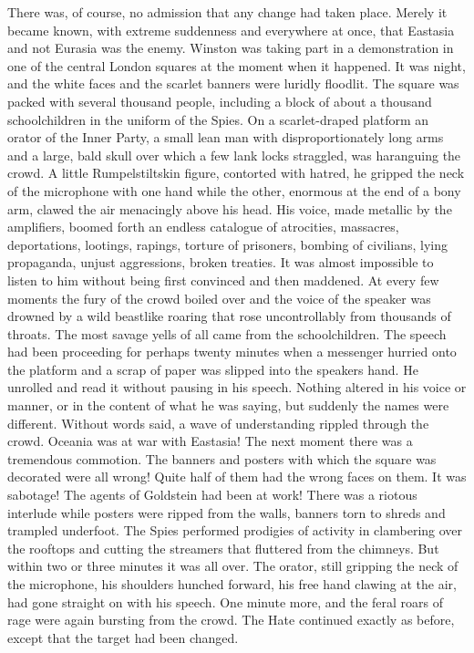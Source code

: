 There was, of course, no admission that any change had taken place.
Merely it became known, with extreme suddenness and everywhere at once,
that Eastasia and not Eurasia was the enemy. Winston was taking part in
a demonstration in one of the central London squares at the moment when
it happened. It was night, and the white faces and the scarlet banners
were luridly floodlit. The square was packed with several thousand
people, including a block of about a thousand schoolchildren in the
uniform of the Spies. On a scarlet-draped platform an orator of the
Inner Party, a small lean man with disproportionately long arms and a
large, bald skull over which a few lank locks straggled, was haranguing
the crowd. A little Rumpelstiltskin figure, contorted with hatred, he
gripped the neck of the microphone with one hand while the other,
enormous at the end of a bony arm, clawed the air menacingly above his
head. His voice, made metallic by the amplifiers, boomed forth an
endless catalogue of atrocities, massacres, deportations, lootings,
rapings, torture of prisoners, bombing of civilians, lying propaganda,
unjust aggressions, broken treaties. It was almost impossible to listen
to him without being first convinced and then maddened. At every few
moments the fury of the crowd boiled over and the voice of the speaker
was drowned by a wild beastlike roaring that rose uncontrollably from
thousands of throats. The most savage yells of all came from the
schoolchildren. The speech had been proceeding for perhaps twenty
minutes when a messenger hurried onto the platform and a scrap of paper
was slipped into the speaker\textquotesingle s hand. He unrolled and
read it without pausing in his speech. Nothing altered in his voice or
manner, or in the content of what he was saying, but suddenly the names
were different. Without words said, a wave of understanding rippled
through the crowd. Oceania was at war with Eastasia! The next moment
there was a tremendous commotion. The banners and posters with which the
square was decorated were all wrong! Quite half of them had the wrong
faces on them. It was sabotage! The agents of Goldstein had been at
work! There was a riotous interlude while posters were ripped from the
walls, banners torn to shreds and trampled underfoot. The Spies
performed prodigies of activity in clambering over the rooftops and
cutting the streamers that fluttered from the chimneys. But within two
or three minutes it was all over. The orator, still gripping the neck of
the microphone, his shoulders hunched forward, his free hand clawing at
the air, had gone straight on with his speech. One minute more, and the
feral roars of rage were again bursting from the crowd. The Hate
continued exactly as before, except that the target had been changed.

